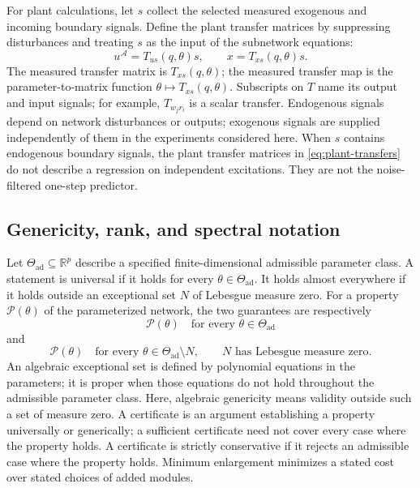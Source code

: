 \documentclass[11pt,a4paper]{article}
\newcommand{\Aset}{\mathcal A}
\begin{document}
For plant calculations, let $s$ collect the selected measured exogenous and incoming boundary signals.  Define the plant transfer matrices by suppressing disturbances and treating $s$ as the input of the subnetwork equations:
\begin{equation}
  u^{\Aset}=T_{us}(q,\theta)s,
  \qquad x=T_{xs}(q,\theta)s.
  \label{eq:plant-transfers}
\end{equation}
The measured transfer matrix is $T_{xs}(q,\theta)$; the measured transfer map is the parameter-to-matrix function $\theta\mapsto T_{xs}(q,\theta)$.  Subscripts on $T$ name its output and input signals; for example, $T_{w_jr_i}$ is a scalar transfer.  Endogenous signals depend on network disturbances or outputs; exogenous signals are supplied independently of them in the experiments considered here.  When $s$ contains endogenous boundary signals, the plant transfer matrices in \eqref{eq:plant-transfers} do not describe a regression on independent excitations.  They are not the noise-filtered one-step predictor.

\subsection{Genericity, rank, and spectral notation}
\label{sec:generic-definitions}

Let $\Theta_{\mathrm{ad}}\subseteq\mathbb R^p$ describe a specified finite-dimensional admissible parameter class.  A statement is universal if it holds for every $\theta\in\Theta_{\mathrm{ad}}$.  It holds almost everywhere if it holds outside an exceptional set $N$ of Lebesgue measure zero.  For a property $\mathcal P(\theta)$ of the parameterized network, the two guarantees are respectively
\[
  \mathcal P(\theta)\quad\text{for every }\theta\in\Theta_{\mathrm{ad}}
\]
and
\begin{equation}
  \mathcal P(\theta)\quad\text{for every }
  \theta\in\Theta_{\mathrm{ad}}\setminus N,
  \qquad N\text{ has Lebesgue measure zero}.
  \label{eq:generic-boundary-condition}
\end{equation}
An algebraic exceptional set is defined by polynomial equations in the parameters; it is proper when those equations do not hold throughout the admissible parameter class.  Here, algebraic genericity means validity outside such a set of measure zero.  A certificate is an argument establishing a property universally or generically; a sufficient certificate need not cover every case where the property holds.  A certificate is strictly conservative if it rejects an admissible case where the property holds.  Minimum enlargement minimizes a stated cost over stated choices of added modules.
\end{document}
